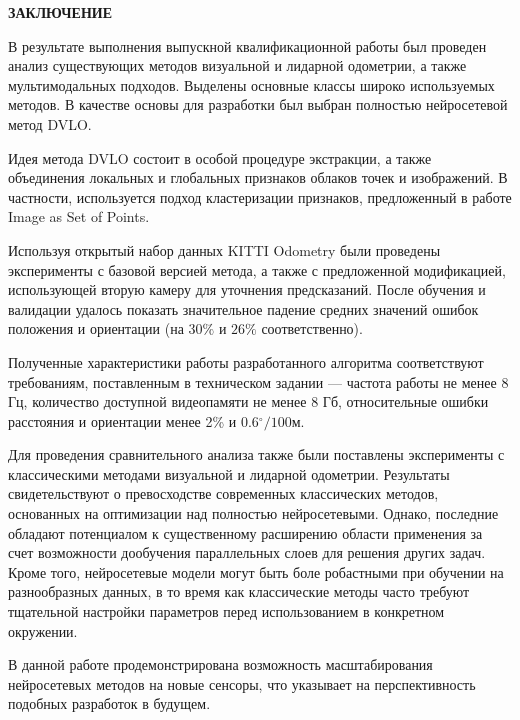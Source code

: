 \newpage
\begin{center}
  \textbf{\large ЗАКЛЮЧЕНИЕ}
\end{center}

В результате выполнения выпускной квалификационной работы был проведен анализ 
существующих методов визуальной и лидарной одометрии, а также мультимодальных
подходов. Выделены основные классы широко используемых методов. В качестве основы 
для разработки был выбран полностью нейросетевой метод DVLO. 

Идея метода DVLO состоит в особой процедуре экстракции, а также объединения локальных и
глобальных признаков облаков точек и изображений. В частности, используется подход кластеризации
признаков, предложенный в работе Image as Set of Points.

Используя открытый набор данных KITTI Odometry были проведены эксперименты с базовой версией метода,
а также с предложенной модификацией, использующей вторую камеру для уточнения предсказаний.
После обучения и валидации удалось показать значительное падение средних значений ошибок
положения и ориентации (на $30\%$ и $26\%$ соответственно).

Полученные характеристики работы разработанного алгоритма соответствуют требованиям, 
поставленным в техническом задании --- частота работы не менее 8 Гц, количество доступной 
видеопамяти не менее 8 Гб, относительные ошибки расстояния и ориентации менее 2\% и 0.6$^\circ/100$м.

Для проведения сравнительного анализа также были поставлены эксперименты с классическими 
методами визуальной и лидарной одометрии. Результаты свидетельствуют о превосходстве
современных классических методов, основанных на оптимизации над полностью нейросетевыми.
Однако, последние обладают потенциалом к существенному расширению области применения
за счет возможности дообучения параллельных слоев для решения других задач. Кроме того,
нейросетевые модели могут быть боле робастными при обучении на разнообразных данных, в то время
как классические методы часто требуют тщательной настройки параметров перед использованием в конкретном окружении.

В данной работе продемонстрирована возможность масштабирования нейросетевых методов на новые сенсоры, что
указывает на перспективность подобных разработок в будущем.

